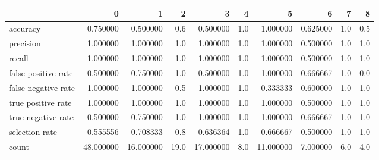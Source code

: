 \begin{tabular}{lrrrrrrrrr}
\toprule
{} &          0 &          1 &     2 &          3 &    4 &          5 &         6 &    7 &    8 \\
\midrule
accuracy            &   0.750000 &   0.500000 &   0.6 &   0.500000 &  1.0 &   1.000000 &  0.625000 &  1.0 &  0.5 \\
precision           &   1.000000 &   1.000000 &   1.0 &   1.000000 &  1.0 &   1.000000 &  0.500000 &  1.0 &  1.0 \\
recall              &   1.000000 &   1.000000 &   1.0 &   1.000000 &  1.0 &   1.000000 &  0.500000 &  1.0 &  1.0 \\
false positive rate &   0.500000 &   0.750000 &   1.0 &   0.500000 &  1.0 &   1.000000 &  0.666667 &  1.0 &  0.0 \\
false negative rate &   1.000000 &   1.000000 &   0.5 &   1.000000 &  1.0 &   0.333333 &  0.600000 &  1.0 &  1.0 \\
true positive rate  &   1.000000 &   1.000000 &   1.0 &   1.000000 &  1.0 &   1.000000 &  0.500000 &  1.0 &  1.0 \\
true negative rate  &   0.500000 &   0.750000 &   1.0 &   1.000000 &  1.0 &   1.000000 &  0.666667 &  1.0 &  1.0 \\
selection rate      &   0.555556 &   0.708333 &   0.8 &   0.636364 &  1.0 &   0.666667 &  0.500000 &  1.0 &  1.0 \\
count               &  48.000000 &  16.000000 &  19.0 &  17.000000 &  8.0 &  11.000000 &  7.000000 &  6.0 &  4.0 \\
\bottomrule
\end{tabular}
